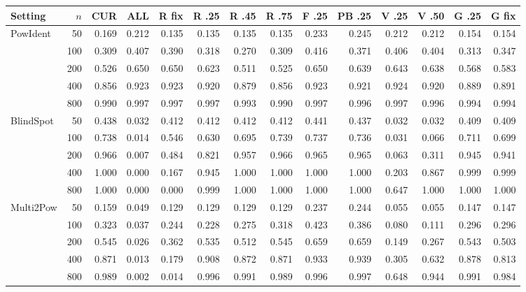 \begin{tabular}{@{}lrrrrrrrrrrrrr@{}}
\toprule
Setting & $n$ & CUR & ALL & R fix & R .25 & R .45 & R .75 & F .25 & PB .25 & V .25 & V .50 & G .25 & G fix\\
\midrule
PowIdent & 50 & 0.169 & 0.212 & 0.135 & 0.135 & 0.135 & 0.135 & 0.233 & 0.245 & 0.212 & 0.212 & 0.154 & 0.154\\
 & 100 & 0.309 & 0.407 & 0.390 & 0.318 & 0.270 & 0.309 & 0.416 & 0.371 & 0.406 & 0.404 & 0.313 & 0.347\\
 & 200 & 0.526 & 0.650 & 0.650 & 0.623 & 0.511 & 0.525 & 0.650 & 0.639 & 0.643 & 0.638 & 0.568 & 0.583\\
 & 400 & 0.856 & 0.923 & 0.923 & 0.920 & 0.879 & 0.856 & 0.923 & 0.921 & 0.924 & 0.920 & 0.889 & 0.891\\
 & 800 & 0.990 & 0.997 & 0.997 & 0.997 & 0.993 & 0.990 & 0.997 & 0.996 & 0.997 & 0.996 & 0.994 & 0.994\\
\addlinespace[2pt]
BlindSpot & 50 & 0.438 & 0.032 & 0.412 & 0.412 & 0.412 & 0.412 & 0.441 & 0.437 & 0.032 & 0.032 & 0.409 & 0.409\\
 & 100 & 0.738 & 0.014 & 0.546 & 0.630 & 0.695 & 0.739 & 0.737 & 0.736 & 0.031 & 0.066 & 0.711 & 0.699\\
 & 200 & 0.966 & 0.007 & 0.484 & 0.821 & 0.957 & 0.966 & 0.965 & 0.965 & 0.063 & 0.311 & 0.945 & 0.941\\
 & 400 & 1.000 & 0.000 & 0.167 & 0.945 & 1.000 & 1.000 & 1.000 & 1.000 & 0.203 & 0.867 & 0.999 & 0.999\\
 & 800 & 1.000 & 0.000 & 0.000 & 0.999 & 1.000 & 1.000 & 1.000 & 1.000 & 0.647 & 1.000 & 1.000 & 1.000\\
\addlinespace[2pt]
Multi2Pow & 50 & 0.159 & 0.049 & 0.129 & 0.129 & 0.129 & 0.129 & 0.237 & 0.244 & 0.055 & 0.055 & 0.147 & 0.147\\
 & 100 & 0.323 & 0.037 & 0.244 & 0.228 & 0.275 & 0.318 & 0.423 & 0.386 & 0.080 & 0.111 & 0.296 & 0.296\\
 & 200 & 0.545 & 0.026 & 0.362 & 0.535 & 0.512 & 0.545 & 0.659 & 0.659 & 0.149 & 0.267 & 0.543 & 0.503\\
 & 400 & 0.871 & 0.013 & 0.179 & 0.908 & 0.872 & 0.871 & 0.933 & 0.939 & 0.305 & 0.632 & 0.878 & 0.813\\
 & 800 & 0.989 & 0.002 & 0.014 & 0.996 & 0.991 & 0.989 & 0.996 & 0.997 & 0.648 & 0.944 & 0.991 & 0.984\\
\bottomrule
\end{tabular}